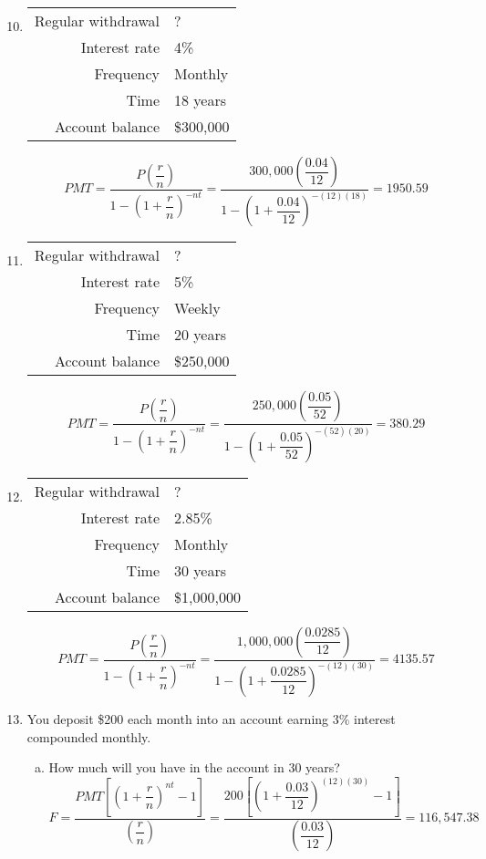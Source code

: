 \begin{enumerate}
\setcounter{enumi}{9}
\item \begin{tabular}{r l}
Regular withdrawal & ?\\
Interest rate & 4\%\\
Frequency & Monthly\\
Time & 18 years\\
Account balance & \$300,000
\end{tabular} 
\[PMT = \dfrac{P\left(\dfrac{r}{n}\right)}{1-\left(1+\dfrac{r}{n}\right)^{-nt}} = \dfrac{300,000\left(\dfrac{0.04}{12}\right)}{1-\left(1+\dfrac{0.04}{12}\right)^{-(12)(18)}} = 1950.59\]

\item \begin{tabular}{r l}
Regular withdrawal & ?\\
Interest rate & 5\%\\
Frequency & Weekly\\
Time & 20 years\\
Account balance & \$250,000
\end{tabular} 
\[PMT = \dfrac{P\left(\dfrac{r}{n}\right)}{1-\left(1+\dfrac{r}{n}\right)^{-nt}} = \dfrac{250,000\left(\dfrac{0.05}{52}\right)}{1-\left(1+\dfrac{0.05}{52}\right)^{-(52)(20)}} = 380.29\]

\item \begin{tabular}{r l}
Regular withdrawal & ?\\
Interest rate & 2.85\%\\
Frequency & Monthly\\
Time & 30 years\\
Account balance & \$1,000,000
\end{tabular} 
\[PMT = \dfrac{P\left(\dfrac{r}{n}\right)}{1-\left(1+\dfrac{r}{n}\right)^{-nt}} = \dfrac{1,000,000\left(\dfrac{0.0285}{12}\right)}{1-\left(1+\dfrac{0.0285}{12}\right)^{-(12)(30)}} = 4135.57\]

\item You deposit \$200 each month into an account earning 3\% interest compounded monthly.
\begin{enumerate}[(a)]
\item How much will you have in the account in 30 years? 
\[F=\dfrac{PMT\left[\left(1+\dfrac{r}{n}\right)^{nt}-1\right]}{\left(\dfrac{r}{n}\right)} = \dfrac{200\left[\left(1+\dfrac{0.03}{12}\right)^{(12)(30)}-1\right]}{\left(\dfrac{0.03}{12}\right)} = 116,547.38\]


\end{enumerate}
\end{enumerate}
